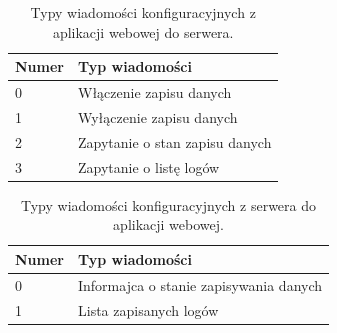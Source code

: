 \documentclass[12pt, a4paper]{article}
\begin{document}
    \begin{table}[H]
        \centering
        \begin{tabular}{| l | l |}
        \hline
        \textbf{Numer} & \textbf{Typ wiadomości} \\
        \hline
        0 & Włączenie zapisu danych \\
        \hline
        1 & Wyłączenie zapisu danych \\
        \hline
        2 & Zapytanie o stan zapisu danych \\
        \hline
        3 & Zapytanie o listę logów \\
        \hline
        \end{tabular}
        \caption{Typy wiadomości konfiguracyjnych z aplikacji webowej do serwera.}
        \end{table}


        \begin{table}[H]
            \centering
            \begin{tabular}{| l | l |}
            \hline
            \textbf{Numer} & \textbf{Typ wiadomości} \\
            \hline
            0 & Informajca o stanie zapisywania danych \\
            \hline
            1 & Lista zapisanych logów \\
            \hline
            \end{tabular}
            \caption{Typy wiadomości konfiguracyjnych z serwera do aplikacji webowej.}
            \end{table}
\end{document}
